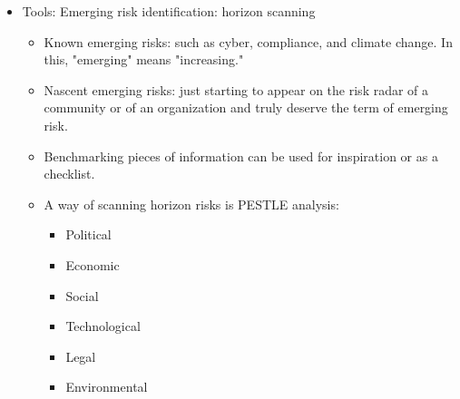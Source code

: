 \begin{itemize}
\item Tools: Emerging risk identification: horizon scanning
    \begin{itemize}
    \item Known emerging risks: such as cyber, compliance, and climate change. In this, "emerging" means "increasing."
    \item  Nascent emerging risks: just starting to appear on the risk radar of a community or of an organization and truly deserve the term of emerging risk.
    \item  Benchmarking pieces of information can be used for inspiration or as a checklist.
    \item A way of scanning horizon risks is PESTLE analysis:
        \begin{itemize}
        \item  Political
        \item  Economic
        \item  Social
        \item  Technological
        \item  Legal
        \item  Environmental
        \end{itemize}
    \end{itemize}
\end{itemize}



